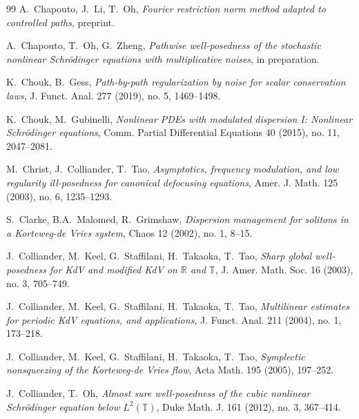 \documentclass[letterpaper, 11pt,  reqno]{amsart}
\newcommand{\1}{\hspace{0.5mm}\text{I}\hspace{0.5mm}}
\newcommand{\R}{\mathbb{R}}
\newcommand{\T}{\mathbb{T}}
\numberwithin{equation}{section}
\numberwithin{theorem}{section}
\begin{document}
\begin{thebibliography}{99}
A.~Chapouto, J.~Li, T.~Oh, 
{\it  Fourier restriction norm method adapted to controlled paths},
preprint.






A.~Chapouto, T.~Oh, G.~Zheng,
{\it  Pathwise well-posedness of the stochastic nonlinear Schr\"odinger equations with multiplicative noises},
in preparation.


K.~Chouk, B.~Gess, 
{\it Path-by-path regularization by noise for scalar conservation laws}, 
J. Funct. Anal. 277 (2019), no. 5, 1469--1498. 




K.~Chouk, M.~Gubinelli, 
{\it Nonlinear PDEs with modulated dispersion I: Nonlinear Schr\"odinger equations},
Comm. Partial Differential Equations 40 (2015), no. 11, 2047--2081. 





M.~Christ, J.~Colliander, T.~Tao,
{\it Asymptotics, frequency modulation, and low regularity ill-posedness for canonical defocusing equations},
Amer. J. Math. 125 (2003), no. 6, 1235--1293.



S.~Clarke, B.A.~Malomed, R.~Grimshaw,
{\it Dispersion management for solitons in a Korteweg-de Vries system},
Chaos 12 (2002), no. 1, 8--15.




J.~Colliander, M.~Keel, G.~Staffilani, H.~Takaoka, T.~Tao,
{\it Sharp global well-posedness for KdV and modified KdV on $\R$ and $\T$},
J. Amer. Math. Soc. 16 (2003), no. 3, 705--749.



J.~Colliander, M.~Keel, G.~Staffilani, H.~Takaoka, T.~Tao,
{\it Multilinear estimates for periodic KdV equations, and applications},
J. Funct. Anal. 211 (2004), no. 1, 173--218.


J.~Colliander, M.~Keel, G.~Staffilani, H.~Takaoka, T.~Tao,
{\it Symplectic nonsqueezing of the Korteweg-de Vries flow}, 
Acta Math. 195 (2005), 197--252. 



J.~Colliander, T.~Oh, 
{\it  Almost sure well-posedness of the cubic nonlinear Schr\"odinger equation below $L^2(\T)$}, 
Duke Math. J. 161 (2012), no. 3, 367--414. 


%


\end{thebibliography}
\end{document}
